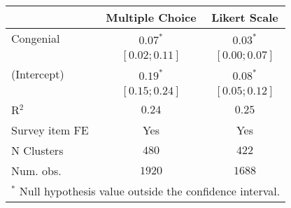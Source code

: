 \begin{table}
\begin{center}
  \begin{tabular}{l c c}
\hline
 & Multiple Choice & Likert Scale \\
\hline
Congenial      & $0.07^{*}$      & $0.03^{*}$      \\
               & $ [0.02; 0.11]$ & $ [0.00; 0.07]$ \\
(Intercept)    & $0.19^{*}$      & $0.08^{*}$      \\
               & $ [0.15; 0.24]$ & $ [0.05; 0.12]$ \\
\hline
R$^2$          & $0.24$          & $0.25$          \\
Survey item FE & Yes             & Yes             \\
N Clusters     & $480$           & $422$           \\
Num. obs.      & $1920$          & $1688$          \\
\hline
\multicolumn{3}{l}{\scriptsize{$^*$ Null hypothesis value outside the confidence interval.}}
\end{tabular}
\end{center}
\end{table}